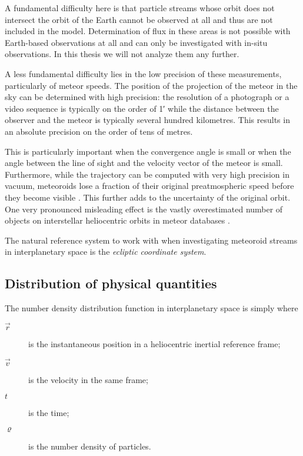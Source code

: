     A fundamental difficulty here is that particle streams whose orbit does not intersect
    the orbit of the Earth cannot be observed at all and thus are not included in the model.
    Determination of flux in these areas is not possible with Earth-based observations at all
    and can only be investigated with in-situ observations. In this thesis we will not analyze them any further.

    A less fundamental difficulty lies in the low precision of these measurements, particularly of meteor speeds.
    The position of the projection of the meteor in the sky can be determined with high precision:
    the resolution of a photograph or a video sequence is typically on the order of \ang{;1;}
    while the distance between the observer and the meteor is typically several hundred kilometres.
    This results in an absolute precision on the order of tens of metres.

    This is particularly important when the convergence angle is small \citep{ceplecha1987} or when the angle between
    the line of sight and the velocity vector of the meteor is small.
    Furthermore, while the trajectory can be computed with very high precision in vacuum,
    meteoroids lose a fraction of their original preatmospheric speed before they become visible \citep{vida+2018}.
    This further adds to the uncertainty of the original orbit.
    One very pronounced misleading effect is the vastly overestimated number of objects
    on interstellar heliocentric orbits in meteor databases \citep{hajdukovajr1994}.

    The natural reference system to work with when investigating meteoroid streams in interplanetary space
    is the \emph{ecliptic coordinate system}.

    \subsection{Distribution of physical quantities} \label{mod}
        The number density distribution function in interplanetary space is simply
        where
        \begin{description}
            \item[$\vec{r}$]    is the instantaneous position in a heliocentric inertial reference frame;
            \item[$\vec{v}$]    is the velocity in the same frame;
            \item[$t$]          is the time;
            \item[$\varrho$]    is the number density of particles.
        \end{description}

